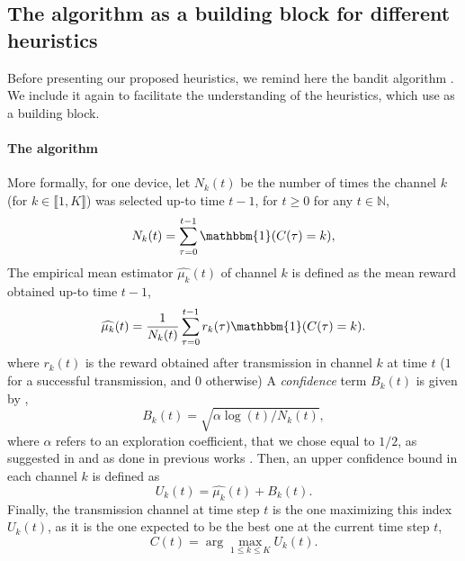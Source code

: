\subsection{The \UCB{} algorithm as a building block for different heuristics}
\label{sub:43:MABalgo}

Before presenting our proposed heuristics, we remind here the \UCB{} bandit algorithm \cite{Auer02}.
We include it again to facilitate the understanding of the heuristics, which use \UCB{} as a building block.


\paragraph{The \UCB{} algorithm}\label{sub:43:algoUCB}

More formally, for one device, let $N_k(t)$ be the number of times the channel $k$ (for $k\in \llbracket 1, K \rrbracket$) was selected up-to time $t-1$, for $t\geq 0$
for any $t\in\mathbb{N}$,
\begin{equation}\label{eq:43:Nkt}
	N_k(t) = \sum_{\tau=0}^{t-1} \mathbbm{1}(C(\tau) = k),
\end{equation}
The empirical mean estimator $\widehat{\mu_k}(t)$ of channel $k$ is defined as the mean reward obtained up-to time $t-1$,
\begin{equation}\label{eq:43:mukt}
	\widehat{\mu_k}(t) = \frac{1}{N_k(t)} \sum_{\tau=0}^{t-1} r_k(\tau) \mathbbm{1}(C(\tau) = k).
\end{equation}
where $r_{k}(t)$ is the reward obtained after transmission in channel $k$ at time $t$ ($1$ for a successful transmission, and $0$ otherwise)
%
A \emph{confidence} term $B_k(t)$ is given by \cite{Auer02},
\begin{equation}\label{eq:43:Bkt}
	B_k(t) = \sqrt{\alpha \log(t) / N_k(t)},
\end{equation}
where $\alpha$ refers to an exploration coefficient,
that we chose equal to $1/2$, as suggested in \cite{Audibert07} and as done in previous works \cite{Bonnefoi18,Bonnefoi17}.
Then, an upper confidence bound in each channel $k$ is defined as
\begin{equation}\label{eq:43:ucb}
	U_k(t) = \widehat{\mu_k}(t) + B_k(t).
\end{equation}
Finally, the transmission channel at time step $t$
is the one maximizing this \UCB{} index $U_k(t)$,
as it is the one expected to be the best one at the current time step $t$,
\begin{equation}\label{eq:43:maxucb}
	C(t) = \arg\max_{1\leq k \leq K} U_k(t).
\end{equation}

